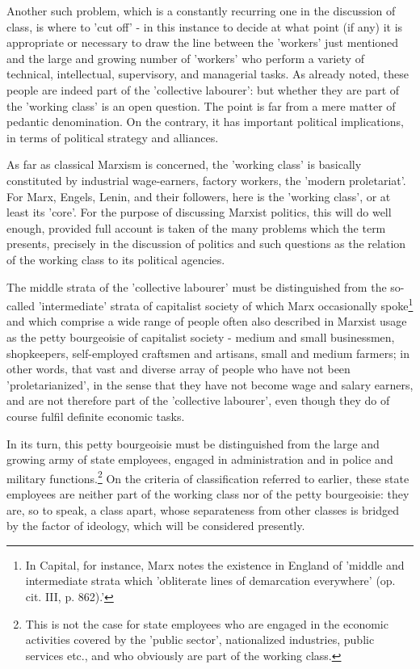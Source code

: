 Another such problem, which is a constantly recurring one in the discussion of class, is where to 'cut off' - in this instance to decide at what point (if any) it is appropriate or necessary to draw the line between the 'workers' just mentioned and the large and growing number of 'workers' who perform a variety of technical, intellectual, supervisory, and managerial tasks. As already noted, these people are indeed part of the 'collective labourer': but whether they are part of the 'working class' is an open question. The point is far from a mere matter of pedantic denomination. On the contrary, it has important political implications, in terms of political strategy and alliances.

As far as classical Marxism is concerned, the 'working class' is basically constituted by industrial wage-earners, factory workers, the 'modern proletariat'. For Marx, Engels, Lenin, and their followers, here is the 'working class', or at least its 'core'. For the purpose of discussing Marxist politics, this will do well enough, provided full account is taken of the many problems which the term presents, precisely in the discussion of politics and such questions as the relation of the working class to its political agencies.

The middle strata of the 'collective labourer' must be distinguished from the so-called 'intermediate' strata of capitalist society of which Marx occasionally spoke\footnote{In Capital, for instance, Marx notes the existence in England of 'middle and intermediate strata which 'obliterate lines of demarcation everywhere' (op. cit. III, p. 862).'} and which comprise a wide range of people often also described in Marxist usage as the petty bourgeoisie of capitalist society - medium and small businessmen, shopkeepers, self-employed craftsmen and artisans, small and medium farmers; in other words, that vast and diverse array of people who have not been 'proletarianized', in the sense that they have not become wage and salary earners, and are not therefore part of the 'collective labourer', even though they do of course fulfil definite economic tasks.

In its turn, this petty bourgeoisie must be distinguished from the large and growing army of state employees, engaged in administration and in police and military functions.\footnote{This is not the case for state employees who are engaged in the economic activities covered by the 'public sector', nationalized industries, public services etc., and who obviously are part of the working class.} On the criteria of classification referred to earlier, these state employees are neither part of the working class nor of the petty bourgeoisie: they are, so to speak, a class apart, whose separateness from other classes is bridged by the factor of ideology, which will be considered presently.

